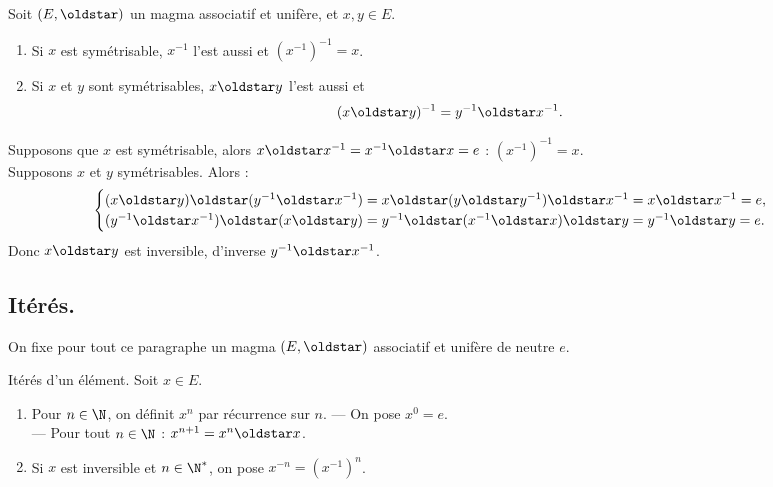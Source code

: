 \documentclass[11pt]{article}
\begin{document}
\begin{prop}{}{}
    Soit $(E,\s)$ un magma associatif et unifère, et $x,y\in E$.
    \begin{enumerate}
        \item Si $x$ est symétrisable, $x^{-1}$ l'est aussi et $(x^{-1})^{-1}=x$.
        \item Si $x$ et $y$ sont symétrisables, $x\s y$ l'est aussi et
        \begin{equation*}
            (x\s y)^{-1} = y^{-1} \s x^{-1}.
        \end{equation*}
    \end{enumerate}
    \tcblower
     Supposons que $x$ est symétrisable, alors $x\s x^{-1}=x^{-1}\s x = e$ : $(x^{-1})^{-1}=x$.\\
     Supposons $x$ et $y$ symétrisables. Alors :
    \begin{equation*}
        \begin{cases}
            (x\s y)\s(y^{-1}\s x^{-1}) = x \s (y \s y^{\vspace*{-0.1cm}-1}) \s x^{-1} = x\s x^{-1} = e,\\
            (y^{-1}\s x^{-1})\s(x\s y) = y^{-1}\s(x^{-1}\s x)\s y = y^{-1}\s y = e.
        \end{cases}
    \end{equation*}
    Donc $x\s y$ est inversible, d'inverse $y^{-1}\s x^{-1}$.
\end{prop}

\subsection{Itérés.}

On fixe pour tout ce paragraphe un magma $(E,\s)$ associatif et unifère de neutre $e$.

\begin{defi}{Itérés d'un élément.}{}
    Soit $x\in E$.
    \begin{enumerate}
        \item Pour $n\in \N$, on définit $x^n$ par récurrence sur $n$.
        --- On pose $x^0 = e$.\\
        --- Pour tout $n\in\N$ : $x^{n+1}=x^n\s x$.
        \item Si $x$ est inversible et $n\in\N^*$, on pose $x^{-n}=(x^{-1})^n$.
    \end{enumerate}
\end{defi}
\end{document}
